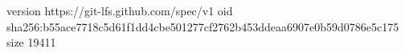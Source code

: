 version https://git-lfs.github.com/spec/v1
oid sha256:b55ace7718c5d61f1dd4cbe501277cf2762b453ddeaa6907e0b59d0786e5c175
size 19411
